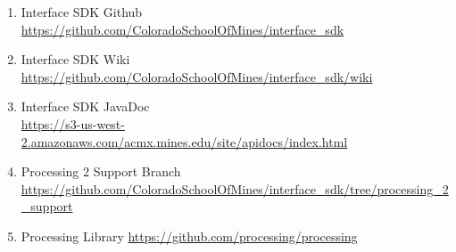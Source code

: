 \documentclass[11pt,letterpaper]{article}
\begin{document}
	\begin{enumerate}
		\item
			Interface SDK Github \\
			\label{link:interface_sdk_github}
			\url{https://github.com/ColoradoSchoolOfMines/interface\_sdk}
		\item
			Interface SDK Wiki \\
			\label{link:interface_sdk_wiki}
			\url{https://github.com/ColoradoSchoolOfMines/interface_sdk/wiki}
		\item
			Interface SDK JavaDoc \\
			\label{link:javadoc}
			\url{https://s3-us-west-2.amazonaws.com/acmx.mines.edu/site/apidocs/index.html}
		\item
			Processing 2 Support Branch \\
			\label{link:processing_2}
			\url{https://github.com/ColoradoSchoolOfMines/interface\_sdk/tree/processing\_2\_support}
		\item
			Processing Library
			\label{link:processing}
			\url{https://github.com/processing/processing}
	\end{enumerate}


 
 
\end{document}

